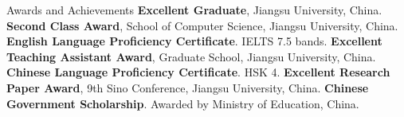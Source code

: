 \begin{rubric}{Awards and Achievements}
%
%
\entry*[2021.06] \textbf{Excellent Graduate}, Jiangsu University, China.
\entry*[2021.03] \textbf{Second Class Award}, School of Computer Science, Jiangsu University, China.
\entry*[2021.03] \textbf{English Language Proficiency Certificate}. IELTS 7.5 bands.
\entry*[2021.01] \textbf{Excellent Teaching Assistant Award}, Graduate School, Jiangsu University, China.
\entry*[2020.08] \textbf{Chinese Language Proficiency Certificate}. HSK 4.
\entry*[2019.11] \textbf{Excellent Research Paper Award}, 9th Sino Conference, Jiangsu University, China.
%
%
\entry*[2018.08] \textbf{Chinese Government Scholarship}. Awarded by Ministry of Education, China.


\end{rubric}